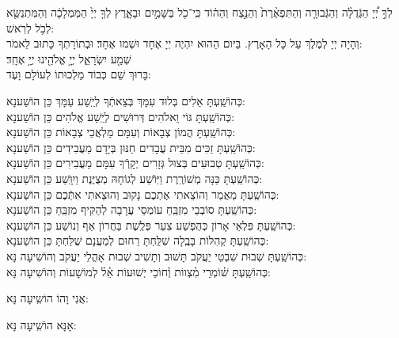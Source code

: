 \documentclass[twoside, openany, parskip=half, 11pt]{book}
\begin{document}
 לְךָ֣  יְ֠יָ הַגְּֿדֻלָּ֨ה וְהַגְּֿבוּרָ֤ה וְהַתִּפְאֶ֨רֶת֙ וְהַנֵּ֣צַח וְהַה֔וֹד 
	כִּֽי־כֹ֖ל בַּשָּׁמַ֣יִם וּבָאָ֑רֶץ	לְךָ֤ יְיָ֙ הַמַּמְלָכָ֔ה 
וְהַמִּתְנַשֵּׂ֖א לְכֹ֥ל לְרֹֽאשׁ:\\
 וְהָיָה  יְיָ לְמֶלֶךְ עַל כָּל הָאָרֶץ. בַּיּום הַהוּא יִהְיֶה יְיָ אֶחָד וּשְׁמו אֶחָד׃ וּבְתוֹרָתְךָ כָּתוּב לֵאמֹר: \\
 שְׁמַ֖ע  יִשְׂרָאֵ֑ל יְיָ֥ אֱלֹהֵ֖ינוּ יְיָ֥ אֶחָֽד׃\\
  בָּרוּךְ שֵׁם כְּבוֹד מַלְכוּתוֹ לְעוֹלָם וָעֶד:

\begin{small}
כְּהוֹשַֽׁעְתָּ אֵלִים בְּלוּד עִמָּךְ בְּצֵאתְֿךָ לְיֵֽשַׁע עַמָּךְ 		\hfill		כֵּן הוֹשַׁענָא: \\
כְּהוֹשַֽׁעְתָּ גּוֹי וֵאלֹהִים דְּרוּשִׁים לְיֵֽשַׁע אֱלֹהִים 			\hfill		כֵּן הוֹשַׁענָא: \\
כְּהוֹשַֽׁעְתָּ הֲמוֹן צְבָאוֹת וְעִמָּם מַלְאֲכֵי צְבָאוֹת 		\hfill		כֵּן הוֹשַׁענָא: \\
כְּהוֹשַֽׁעְתָּ זַכִּים מִבֵּית עֲבָדִים חַנּוּן בְּיָדָם מַעֲבִידִים 		\hfill		כֵּן הוֹשַׁענָא: \\
כְּהוֹשַֽׁעְתָּ טְבוּעִים בְּצוּל גְּזָרִים יְקָרְֿךָ עִמָּם מַעֲבִירִים 		\hfill		כֵּן הוֹשַׁענָא: \\
כְּהוֹשַֽׁעְתָּ כַּנָּה מְשׁוֹרֶֽרֶת וַיּֽוֹשַׁע לְגוֹחָהּ מְצֻיֶּנֶת וַיִוָּֽשַׁע 		\hfill		כֵּן הוֹשַׁענָא: \\
כְּהוֹשַֽׁעְתָּ מַאֲמַר וְהוֹצֵאתִי אֶתְכֶם נָקוּב וְהוּצֵאתִי אִתְּֿכֶם 	\hfill		כֵּן הוֹשַׁענָא:\\
כְּהוֹשַֽׁעְתָּ סוֹבְבֵי מִזְבֵּֽחַ עוֹמְסֵי עֲרָבָה לְהַקִּיף מִזְבֵּֽחַ 		\hfill		כֵּן הוֹשַׁענָא: \\
כְּהוֹשַֽׁעְתָּ פִּלְאֵי אָרוֹן כְּהֻפְשַׁע צִעֵר פְּלֶֽשֶׁת בַּחֲרוֹן אַף וְנוֹשַׁע 	\hfill		כֵּן הוֹשַׁענָא: \\
כְּהוֹשַֽׁעְתָּ קְהִלּוֹת בָּבֶֽלָה שִׁלַּֽחְתָּ רַחוּם לְמַעֲנָם שֻׁלַּחְתָּ 		\hfill		כֵּן הוֹשַׁענָא:\\
כְּהוֹשַֽׁעְתָּ שְׁבוּת שִׁבְטֵי יַעֲקֹב תָּשׁוּב וְתָשִׁיב שְׁבוּת אָהֳלֵי יַעֲקֹב \hfill		וְהוֹשִׁיעָה נָּא:\\
 כְּהוֹשַֽׁעְתָּ שׁ֗וֹמְרֵי מִ֗צְווֹת וְ֗חוֹכֵי יְשׁוּעוֹת אֵ֗ל֗ לְמוֹשָׁעוֹת 		\hfill	וְהוֹשִׁיעָה נָּא:

\end{small}

\begin{large}
אֲנִי וָהוֹ הוֹשִֽיעָה נָּא:

 אָנָּא הוֹשִֽׁיעָה נָּא:

\end{large}
\end{document}
